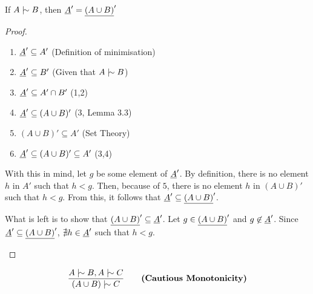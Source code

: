 \documentclass[11pt]{article}
\begin{document}
\begin{lemma}
  If $A \twiddle B$, then $\underline{A}' = \underline{(A \cup B)}'$
\end{lemma}

\begin{proof}
  \begin{enumerate}
    \item $\underline{A}' \subseteq A'$ \hfill (Definition of minimisation)
    \item $\underline{A}' \subseteq B'$ \hfill (Given that $A \twiddle B$)
    \item $\underline{A}' \subseteq A' \cap B'$ \hfill (1,2)
    \item $\underline{A}' \subseteq (A \cup B)'$ \hfill (3, Lemma 3.3)
    \item $(A \cup B)' \subseteq A'$ \hfill (Set Theory)
    \item $\underline{A}' \subseteq (A \cup B)' \subseteq A'$ \hfill (3,4)
  \end{enumerate}

  With this in mind, let $g$ be some element of $\underline{A}'$. By definition, there is no element $h$ in $A'$ such that $h < g$. Then, because of $5$, there is no element $h$ in $(A\cup B)'$ such that $h < g$. From this, it follows that $\underline{A}' \subseteq \underline{(A \cup B)}'$.

  What is left is to show that $\underline{(A\cup B)}' \subseteq \underline{A}'$. Let $g \in \underline{(A\cup B)}'$ and $g \not \in \underline{A}'$. Since $\underline{A}' \subseteq \underline{(A\cup B)}'$, $\nexists h \in \underline{A}'$ such that $h < g$.

  \begin{center}
  \end{center}
\end{proof}

\begin{equation}
  \frac{A \twiddle B, A \twiddle C}{(A \cup B) \twiddle C} \qquad \textbf{(Cautious Monotonicity)}
\end{equation}
\end{document}
